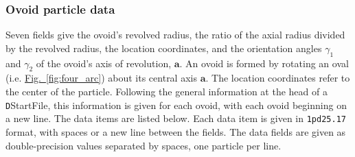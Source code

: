 \documentclass[letterpaper,11pt]{article}
\begin{document}
\subsubsection{Ovoid particle data}\label{sec:ovoid_data}
Seven fields give the
ovoid's revolved radius, the ratio of the axial radius divided
by the revolved radius, the location coordinates, and the orientation
angles $\gamma_{1}$ and $\gamma_{2}$ of the ovoid's axis of revolution,
$\mathbf{a}$.
An ovoid is formed by rotating an oval
(i.e. \hyperref[fig:four_arc]{Fig.~\ref*{fig:four_arc}})
about its central axis $\mathbf{a}$.
The location coordinates refer to the center of the particle.
Following the general information at the head of a
\texttt{D}\textsf{StartFile}, this
information is given for each ovoid,
with each ovoid beginning on a new line.
The data items are listed below.
Each data item is given in \texttt{1pd25.17} format, with
spaces or a new line between the fields.
The data fields are given as double-precision values
separated by spaces, one particle per line.
\end{document}

